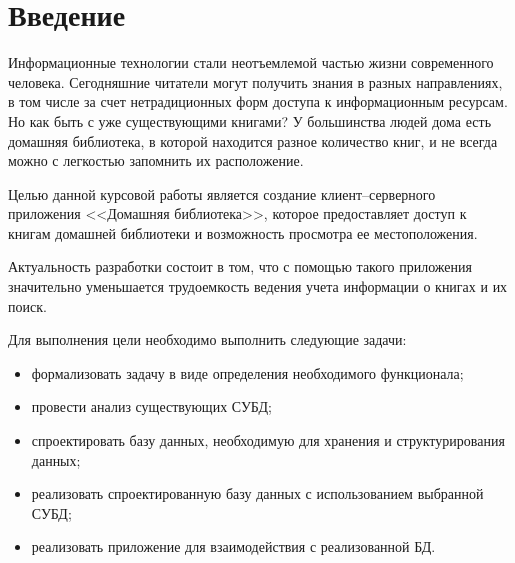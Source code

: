 \newpage
\section*{Введение}

Информационные технологии стали неотъемлемой частью жизни современного человека. 
Сегодняшние читатели могут получить знания в разных направлениях, в том числе  за счет нетрадиционных форм доступа к информационным ресурсам. Но как быть с уже существующими книгами? 
У большинства людей дома есть домашняя библиотека, в которой находится разное количество книг, и не всегда можно с легкостью запомнить их расположение.
\hfill \break

  Целью данной курсовой работы является создание клиент–серверного приложения <<Домашняя библиотека>>, которое предоставляет доступ к книгам домашней библиотеки и возможность просмотра ее местоположения.
  
  Актуальность разработки состоит в том, что с помощью такого приложения значительно уменьшается трудоемкость ведения учета информации о книгах и их поиск.
  
  Для выполнения цели необходимо выполнить следующие задачи:
  \begin{itemize}
	\item формализовать задачу в виде определения необходимого функционала;
	\item провести анализ существующих СУБД;
	\item спроектировать базу данных, необходимую для хранения и структурирования данных;
	\item реализовать спроектированную базу данных с использованием выбранной СУБД;
	\item реализовать приложение для взаимодействия с реализованной БД.
\end{itemize}

